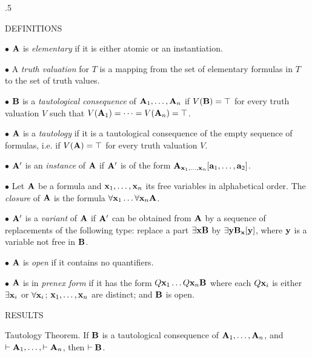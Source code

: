 \vglue .5\baselineskip 

\beginsection DEFINITIONS

\item{$\bullet$} ${\bf A}$ is {\it elementary} if it is either atomic or an instantiation.

\item{$\bullet$} A {\it truth valuation} for $T$ is a mapping from the set of elementary 
formulas in $T$ to the set of truth values.

\item{$\bullet$} ${\bf B}$ is a {\it tautological consequence} of ${\bf A}_1, \dots , {\bf A}_n$ 
if $V({\bf B}) = \top$ for every truth valuation $V$ such that 
$V({\bf A}_1) = \cdots = V({\bf A}_n) = \top$.

\item{$\bullet$} ${\bf A}$ is a {\it tautology} if it is a tautological consequence of 
the empty sequence of formulas, i.e. if $V({\bf A}) = \top$ for every truth valuation $V$.

\item{$\bullet$} ${\bf A}'$ is an {\it instance} of ${\bf A}$ if ${\bf A}'$ is of the form ${\bf A}_{{\bf x}_1, \dots, {\bf x}_n}[{\bf a}_1, \dots, {\bf a}_2]$.

\item{$\bullet$} Let ${\bf A}$ be a formula and ${\bf x}_1, \dots, {\bf x}_n$ its free variables in alphabetical order. The {\it closure}
of ${\bf A}$ is the formula $\forall {\bf x}_1 \dots \forall {\bf x}_n {\bf A}$.

\item{$\bullet$} ${\bf A}'$ is a {\it variant} of ${\bf A}$ if ${\bf A}'$ can be obtained from ${\bf A}$ by a sequence of replacements of the
following type: replace a part $\exists {\bf x}{\bf B}$ by $\exists {\bf y}{\bf B}_{\bf x}[{\bf y}]$, where ${\bf y}$ is a variable not free in ${\bf B}$.

\item{$\bullet$} ${\bf A}$ is {\it open} if it contains no quantifiers.

\item{$\bullet$} ${\bf A}$ is in {\it prenex form} if it has the form $Q{\bf x}_1 \dots Q{\bf x}_n{\bf B}$ 
where each $Q{\bf x}_i$ is either $\exists{\bf x}_i$ or $\forall{\bf x}_i$; ${\bf x}_1, \dots, {\bf x}_n$ are
distinct; and ${\bf B}$ is open.

\beginsection RESULTS


\proclaim Tautology Theorem. If ${\bf B}$ is a tautological consequence of ${\bf A}_1, \dots, {\bf A}_n$,
and $\vdash{\bf A}_1, \dots, \vdash {\bf A}_n$, then $\vdash {\bf B}$.

